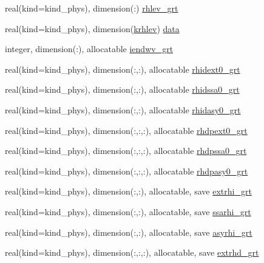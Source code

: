 \begin{DoxyCompactItemize}
real(kind=kind\+\_\+phys), dimension(\+:) \hyperlink{namespacemodule__radiation__aerosols_ace40d50e36de1fc08c4ff35f6d8dbda9}{rhlev\+\_\+grt}
\item 
real(kind=kind\+\_\+phys), dimension(\hyperlink{namespacemodule__radiation__aerosols_a33f2d4489a1730a27cbdc2e2add0f977}{krhlev}) \hyperlink{namespacemodule__radiation__aerosols_a1248e740e53498ed7a06f7d475b1fb25}{data}
\item 
integer, dimension(\+:), allocatable \hyperlink{namespacemodule__radiation__aerosols_ac755c4235327053fff060ffa3b2ee2a3}{iendwv\+\_\+grt}
\item 
real(kind=kind\+\_\+phys), dimension(\+:,\+:), allocatable \hyperlink{namespacemodule__radiation__aerosols_a6683021bded82850053c16eb3e906998}{rhidext0\+\_\+grt}
\item 
real(kind=kind\+\_\+phys), dimension(\+:,\+:), allocatable \hyperlink{namespacemodule__radiation__aerosols_aea46db63db26a316e73640bc63f75383}{rhidssa0\+\_\+grt}
\item 
real(kind=kind\+\_\+phys), dimension(\+:,\+:), allocatable \hyperlink{namespacemodule__radiation__aerosols_a8491a714c86e9bd7ebdc401662f5068e}{rhidasy0\+\_\+grt}
\item 
real(kind=kind\+\_\+phys), dimension(\+:,\+:,\+:), allocatable \hyperlink{namespacemodule__radiation__aerosols_a35a5c7b67a3cf11c5016a693e115d384}{rhdpext0\+\_\+grt}
\item 
real(kind=kind\+\_\+phys), dimension(\+:,\+:,\+:), allocatable \hyperlink{namespacemodule__radiation__aerosols_a40d680662eadf30221997dadcce734b1}{rhdpssa0\+\_\+grt}
\item 
real(kind=kind\+\_\+phys), dimension(\+:,\+:,\+:), allocatable \hyperlink{namespacemodule__radiation__aerosols_ab5a0bbefbfed6b393f0abad26e6e4d04}{rhdpasy0\+\_\+grt}
\item 
real(kind=kind\+\_\+phys), dimension(\+:,\+:), allocatable, save \hyperlink{namespacemodule__radiation__aerosols_acb7ff037be78e950ea42d956816c93d5}{extrhi\+\_\+grt}
\item 
real(kind=kind\+\_\+phys), dimension(\+:,\+:), allocatable, save \hyperlink{namespacemodule__radiation__aerosols_ae8587d9b4ebd9cf5d363a82d15049324}{ssarhi\+\_\+grt}
\item 
real(kind=kind\+\_\+phys), dimension(\+:,\+:), allocatable, save \hyperlink{namespacemodule__radiation__aerosols_a4b5f80817af9f2116618d6c8f0e194de}{asyrhi\+\_\+grt}
\item 
real(kind=kind\+\_\+phys), dimension(\+:,\+:,\+:), allocatable, save \hyperlink{namespacemodule__radiation__aerosols_a07bfe1ada075519d1d3ceabe21b65a96}{extrhd\+\_\+grt}

\end{DoxyCompactItemize}
